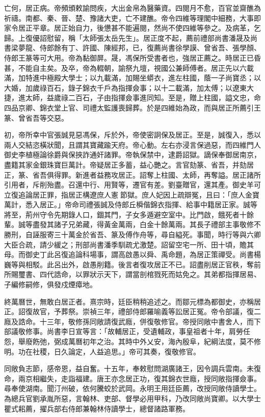 \begin{pinyinscope}
亡何，居正病。帝頻頒敕諭問疾，大出金帛為醫藥資。四閱月不愈，百官並齋醮為祈禱。南都、秦、晉、楚、豫諸大吏，亡不建醮。帝令四維等理閣中細務，大事即家令居正平章。居正始自力，後憊甚不能遍閱，然尚不使四維等參之。及病革，乞歸。上復優詔慰留，稱「太師張太岳先生」。居正度不起，薦前禮部尚書潘晟及尚書梁夢龍、侍郎餘有丁、許國、陳經邦，已，復薦尚書徐學謨、曾省吾、張學顏、侍郎王篆等可大用。帝為黏御屏。晟，馮保所受書者也，強居正薦之。時居正已昏甚，不能自主矣。及卒，帝為輟朝，諭祭九壇，視國公兼師傅者。居正先以六載滿，加特進中極殿大學士；以九載滿，加賜坐蟒衣，進左柱國，蔭一子尚寶丞；以大婚，加歲祿百石，錄子錦衣千戶為指揮僉事；以十二載滿，加太傅；以遼東大捷，進太師，益歲祿二百石，子由指揮僉事進同知。至是，贈上柱國，謚文忠，命四品京卿、錦衣堂上官、司禮太監護喪歸葬。於是四維始為政，而與居正所薦引王篆、曾省吾等交惡。

初，帝所幸中官張誠見惡馮保，斥於外，帝使密詗保及居正。至是，誠復入，悉以兩人交結恣橫狀聞，且謂其寶藏踰天府。帝心動。左右亦浸言保過惡，而四維門人御史李植極論徐爵與保挾詐通奸諸罪。帝執保禁中，逮爵詔獄。謫保奉御居南京，盡籍其家金銀珠寶巨萬計。帝疑居正多蓄，益心艷之。言官劾篆、省吾，并劾居正，篆、省吾俱得罪。新進者益務攻居正。詔奪上柱國、太師，再奪謚。居正諸所引用者，斥削殆盡。召還中行、用賢等，遷官有差。劉臺贈官，還其產。御史羊可立復追論居正罪，指居正構遼庶人憲節獄。庶人妃因上疏辯冤，且曰：「庶人金寶萬計，悉入居正。」帝命司禮張誠及侍郎丘橓偕錦衣指揮、給事中籍居正家。誠等將至，荊州守令先期錄人口，錮其門，子女多遁避空室中。比門啟，餓死者十餘輩。誠等盡發其諸子兄弟藏，得黃金萬兩，白金十餘萬兩。其長子禮部主事敬修不勝刑，自誣服寄三十萬金於省吾、篆及傅作舟等，尋自縊死。事聞，時行等與六卿大臣合疏，請少緩之；刑部尚書潘季馴疏尤激楚。詔留空宅一所、田十頃，贍其母。而御史丁此呂復追論科場事，謂高啟愚以舜、禹命題，為居正策禪受。尚書楊巍等與相駁。此呂出外，啟愚削籍。後言者復攻居正不已。詔盡削居正官秩，奪前所賜璽書、四代誥命，以罪狀示天下，謂當剖棺戮死而姑免之。其弟都指揮居易、子編修嗣修，俱發戍煙瘴地。

終萬曆世，無敢白居正者。熹宗時，廷臣稍稍追述之。而鄒元標為都御史，亦稱居正。詔復故官，予葬祭。崇禎三年，禮部侍郎羅喻義等訟居正冤。帝令部議，復二廕及誥命。十三年，敬修孫同敞請復武廕，併復敬修官。帝授同敞中書舍人，而下部議敬修事。尚書李日宣等言：「故輔居正，受遺輔政，事皇祖者十年，肩勞任怨，舉廢飭弛，弼成萬曆初年之治。其時中外乂安，海內殷阜，紀綱法度，莫不修明。功在社稷，日久論定，人益追思。」帝可其奏，復敬修官。

同敞負志節，感帝恩，益自奮。十五年，奉敕慰問湖廣諸王，因令調兵雲南。未復命，兩京相繼失，走詣福建。唐王亦念居正功，復其錦衣世廕，授同敞指揮僉事。尋奉使湖南。聞汀州破，依何騰蛟於武岡。永明王用廷臣薦，改授同敞侍讀學士。為總兵官劉承胤所惡，言翰林、吏部、督學必用甲科，乃改同敞尚寶卿。以大學士瞿式耜薦，擢兵部右侍郎兼翰林侍讀學士，總督諸路軍務。


\end{pinyinscope}
